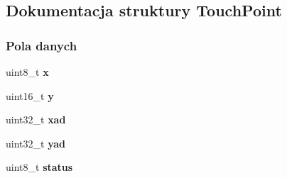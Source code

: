 \hypertarget{struct_touch_point}{}\subsection{Dokumentacja struktury Touch\+Point}
\label{struct_touch_point}
\subsubsection*{Pola danych}
\begin{DoxyCompactItemize}
\item 
\mbox{\label{struct_touch_point_af5f7bc18f18a9adb6db8eb3478b86842}} 
uint8\+\_\+t {\bfseries x}
\item 
\mbox{\label{struct_touch_point_adb38543f89b8b0e80e92dcc461bfafde}} 
uint16\+\_\+t {\bfseries y}
\item 
\mbox{\label{struct_touch_point_ab30525fbaf4294be6604fee8b5396ee7}} 
uint32\+\_\+t {\bfseries xad}
\item 
\mbox{\label{struct_touch_point_a1a196181eedef68ca5df7883f77b787b}} 
uint32\+\_\+t {\bfseries yad}
\item 
\mbox{\label{struct_touch_point_a1e1a2ac07f034dd7616df336c8048b65}} 
uint8\+\_\+t {\bfseries status}
\end{DoxyCompactItemize}
